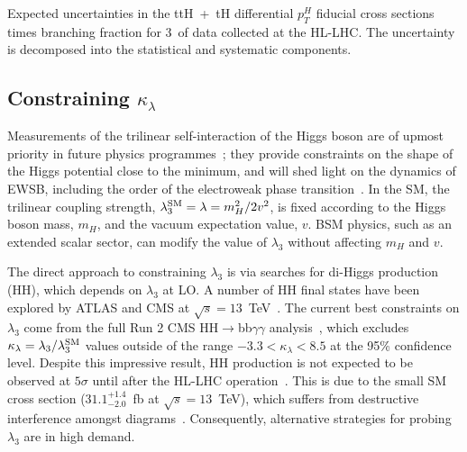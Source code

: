 \begin{table}[htb!]
  \centering
  \renewcommand{\arraystretch}{1.8}
  \setlength{\tabcolsep}{15pt}
  \caption[Expected sensitivities of top-associated differential cross sections at the HL-LHC]
  {
    Expected uncertainties in the ttH~+~tH differential $p_T^H$ fiducial cross sections times branching fraction for 3~\abinv of data collected at the HL-LHC. The uncertainty is decomposed into the statistical and systematic components.
  }
  \label{tab:trilinear_dxs_results}
  \hspace*{-1cm}
  
  \hspace*{-1cm}
\end{table}

\subsection{Constraining $\kappa_\lambda$}
Measurements of the trilinear self-interaction of the Higgs boson are of upmost priority in future physics programmes~\cite{Cepeda:2019klc}; they provide constraints on the shape of the Higgs potential close to the minimum, and will shed light on the dynamics of EWSB, including the order of the electroweak phase transition~\cite{PhysRevD.13.974,PhysRevD.20.2619,Kajantie:1995kf,Csikor:1998eu}. In the SM, the trilinear coupling strength, $\lambda^{\rm{SM}}_3=\lambda=m_H^2/2v^2$, is fixed according to the Higgs boson mass, $m_H$, and the vacuum expectation value, $v$. BSM physics, such as an extended scalar sector, can modify the value of $\lambda_3$ without affecting $m_H$ and $v$.

The direct approach to constraining $\lambda_3$ is via searches for di-Higgs production (HH), which depends on $\lambda_3$ at LO. A number of HH final states have been explored by ATLAS and CMS at $\sqrt{s}=13$~TeV~\cite{Sirunyan:2018ayu,Aad:2019uzh}. The current best constraints on $\lambda_3$ come from the full Run 2 CMS HH$\rightarrow$bb$\gamma\gamma$ analysis~\cite{Sirunyan:2020xok}, which excludes $\kappa_\lambda=\lambda_3/\lambda_3^{\rm{SM}}$ values outside of the range $-3.3 < \kappa_\lambda < 8.5$ at the 95\% confidence level. Despite this impressive result, HH production is not expected to be observed at $5\sigma$ until after the HL-LHC operation~\cite{Cepeda:2019klc}. This is due to the small SM cross section ($31.1^{+1.4}_{-2.0}$~fb at $\sqrt{s}=13$~TeV), which suffers from destructive interference amongst diagrams~\cite{Grazzini:2018bsd}. Consequently, alternative strategies for probing $\lambda_3$ are in high demand.

